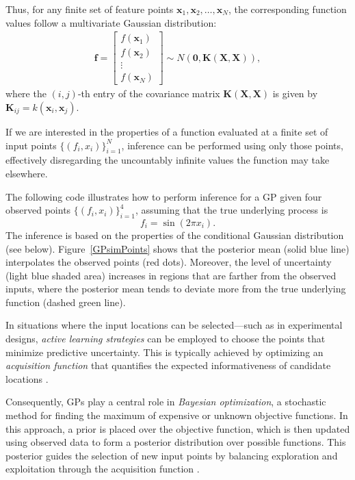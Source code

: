Thus, for any finite set of feature points \( \mathbf{x}_1, \mathbf{x}_2, \dots, \mathbf{x}_N \), the corresponding function values follow a multivariate Gaussian distribution:
\begin{align*}
	\mathbf{f} =
	\begin{bmatrix}
		f(\mathbf{x}_1) \\
		f(\mathbf{x}_2) \\
		\vdots \\
		f(\mathbf{x}_N)
	\end{bmatrix}
	\sim N(\mathbf{0}, \mathbf{K}(\mathbf{X}, \mathbf{X})),
\end{align*}
where the \( (i,j) \)-th entry of the covariance matrix \( \mathbf{K}(\mathbf{X}, \mathbf{X}) \) is given by \( \mathbf{K}_{ij} = k(\mathbf{x}_i, \mathbf{x}_j) \).

If we are interested in the properties of a function evaluated at a finite set of input points \( \{(f_i, x_i)\}_{i=1}^N\), inference can be performed using only those points, effectively disregarding the uncountably infinite values the function may take elsewhere.

The following code illustrates how to perform inference for a GP given four observed points \( \{(f_i, x_i)\}_{i=1}^4 \), assuming that the true underlying process is
\[
f_i = \sin(2\pi x_i).
\]
The inference is based on the properties of the conditional Gaussian distribution (see below). Figure~\ref{GPsimPoints} shows that the posterior mean (solid blue line) interpolates the observed points (red dots). Moreover, the level of uncertainty (light blue shaded area) increases in regions that are farther from the observed inputs, where the posterior mean tends to deviate more from the true underlying function (dashed green line).

In situations where the input locations can be selected—such as in experimental designs, \textit{active learning strategies} can be employed to choose the points that minimize predictive uncertainty. This is typically achieved by optimizing an \textit{acquisition function} that quantifies the expected informativeness of candidate locations \cite{settles2012active}. 

Consequently, GPs play a central role in \textit{Bayesian optimization}, a stochastic method for finding the maximum of expensive or unknown objective functions. In this approach, a prior is placed over the objective function, which is then updated using observed data to form a posterior distribution over possible functions. This posterior guides the selection of new input points by balancing exploration and exploitation through the acquisition function \cite{brochu2010tutorial}.

